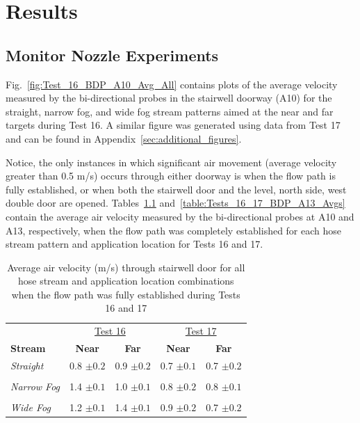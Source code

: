 \documentclass[12pt,oneside]{book}
\begin{document}
\chapter{Results}
\label{chap:Results}

\section{Monitor Nozzle Experiments}
\label{sec:monitor_results}

Fig.~\ref{fig:Test_16_BDP_A10_Avg_All} contains plots of the average velocity measured by the bi-directional probes in the stairwell doorway (A10) for the straight, narrow fog, and wide fog stream patterns aimed at the near and far targets during Test 16. A similar figure was generated using data from Test 17 and can be found in Appendix~\ref{sec:additional_figures}.

Notice, the only instances in which significant air movement (average velocity greater than 0.5 m/s) occurs through either doorway is when the flow path is fully established, or when both the stairwell door and the  level, north side, west double door are opened. Tables~\ref{table:Tests_16_17_BDP_A10_Avgs} and~\ref{table:Tests_16_17_BDP_A13_Avgs} contain the average air velocity measured by the bi-directional probes at A10 and A13, respectively, when the flow path was completely established for each hose stream pattern and application location for Tests 16 and 17.


\clearpage

\begin{table}[!ht]
\caption{Average air velocity (m/s) through stairwell door for all hose stream and application location combinations when the flow path was fully established during Tests 16 and 17}
\begin{tabular}{lcccc}
\toprule
 & \multicolumn{2}{c}{\underline{Test 16}} & \multicolumn{2}{c}{\underline{Test 17}}
\\
\textbf{Stream} & \textbf{Near} & \textbf{Far} & \textbf{Near} & \textbf{Far} \\
\midrule
\textit{Straight} & 
0.8 $\pm 0.2$ & 0.9 $\pm 0.2$ & 
0.7 $\pm 0.1$ & 0.7 $\pm 0.2$
\\	\multicolumn{5}{c}{}	\\
\textit{Narrow Fog} & 
1.4 $\pm 0.1$ & 1.0 $\pm 0.1$ & 
0.8 $\pm 0.2$ & 0.8 $\pm 0.1 $          
\\	\multicolumn{5}{c}{}	\\
\textit{Wide Fog} 	& 
1.2 $\pm 0.1$ & 1.4 $\pm 0.1$ & 
0.9 $\pm 0.2$ & 0.7 $\pm 0.2$
\\
\bottomrule
\end{tabular}
\label{table:Tests_16_17_BDP_A10_Avgs}
\end{table}
\end{document}
